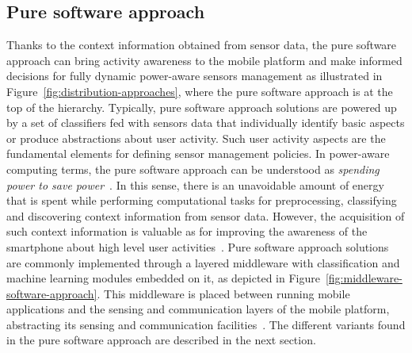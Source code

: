 \documentclass[ENG,PhD]{cinvestav}
\begin{document}
\subsection{Pure software approach}
Thanks to the context information obtained from sensor data, the pure software approach can bring activity awareness to the mobile platform and make informed decisions for fully dynamic power-aware sensors management as illustrated in Figure~\ref{fig:distribution-approaches}, where the pure software approach is at the top of the hierarchy.
Typically, pure software approach solutions are powered up by a set of classifiers fed with sensors data that individually identify basic aspects or produce abstractions about user activity.
Such user activity aspects are the fundamental elements for defining sensor management policies.
In power-aware computing terms, the pure software approach can be understood as \emph{spending power to save power}~\cite{Ranganathan2010}.
In this sense, there is an unavoidable amount of energy that is spent while performing computational tasks for preprocessing, classifying and discovering context information from sensor data.
However, the acquisition of such context information is valuable as for improving the awareness of the smartphone about high level user activities~\cite{Yurur2014c}.
Pure software approach solutions are commonly implemented through a layered middleware with classification and machine learning modules embedded on it, as depicted in Figure~\ref{fig:middleware-software-approach}.
This middleware is placed between running mobile applications and the sensing and communication layers of the mobile platform, abstracting its sensing and communication facilities~\cite{Yurur2014}.
The different variants found in the pure software approach are described in the next section.
\end{document}
